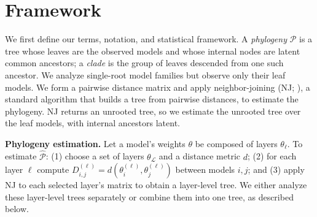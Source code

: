\documentclass{article}
\theoremstyle{definition}
\theoremstyle{plain}
\begin{document}








\section{Framework}
\label{sec:framework}

We first define our terms, notation, and statistical framework. A \emph{phylogeny} $\mathcal{P}$ is a tree
whose leaves are the observed models and whose internal nodes are latent common ancestors; a
\emph{clade} is the group of leaves descended from one such ancestor. We analyze
single-root model families but observe only their leaf models. We form a pairwise distance matrix and apply neighbor-joining (NJ;
\citealp{saitou1987neighbor}), a standard algorithm that builds a tree from pairwise distances, to estimate the phylogeny. NJ returns an unrooted tree, so we estimate the unrooted tree over the leaf models, with internal ancestors latent.

\textbf{Phylogeny estimation.}\label{sec:framework:phylo}
Let a model's weights $\theta$ be composed of layers $\theta_\ell$. To estimate $\widehat{\mathcal{P}}$: (1) choose a set of layers $\theta_\mathcal{L}$ and a distance metric $d$;
(2) for each layer $\ell$ compute $D_{i,j}^{(\ell)} = d(\theta^{(\ell)}_i, \theta^{(\ell)}_j)$ between models
$i,j$; and (3) apply NJ to each selected layer's matrix to obtain a layer-level tree. We either
analyze these layer-level trees separately or combine them into one tree, as described below.
\end{document}
